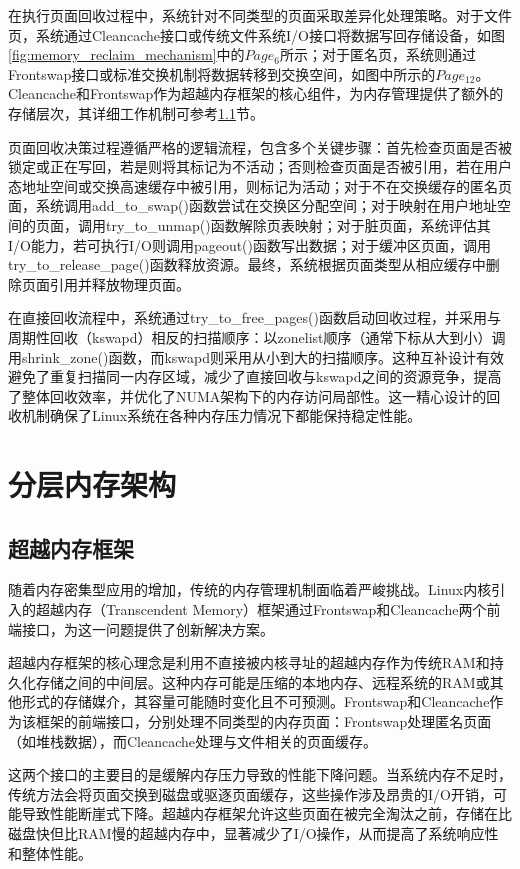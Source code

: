 在执行页面回收过程中，系统针对不同类型的页面采取差异化处理策略。对于文件页，系统通过Cleancache接口或传统文件系统I/O接口将数据写回存储设备，如图\ref{fig:memory_reclaim_mechanism}中的$Page_{6}$所示；对于匿名页，系统则通过Frontswap接口或标准交换机制将数据转移到交换空间，如图中所示的$Page_{12}$。Cleancache和Frontswap作为超越内存框架的核心组件，为内存管理提供了额外的存储层次，其详细工作机制可参考\ref{sec:超越内存框架}节。

页面回收决策过程遵循严格的逻辑流程，包含多个关键步骤：首先检查页面是否被锁定或正在写回，若是则将其标记为不活动；否则检查页面是否被引用，若在用户态地址空间或交换高速缓存中被引用，则标记为活动；对于不在交换缓存的匿名页面，系统调用add\_to\_swap()函数尝试在交换区分配空间；对于映射在用户地址空间的页面，调用try\_to\_unmap()函数解除页表映射；对于脏页面，系统评估其I/O能力，若可执行I/O则调用pageout()函数写出数据；对于缓冲区页面，调用try\_to\_release\_page()函数释放资源。最终，系统根据页面类型从相应缓存中删除页面引用并释放物理页面。

在直接回收流程中，系统通过try\_to\_free\_pages()函数启动回收过程，并采用与周期性回收（kswapd）相反的扫描顺序：以zonelist顺序（通常下标从大到小）调用shrink\_zone()函数，而kswapd则采用从小到大的扫描顺序。这种互补设计有效避免了重复扫描同一内存区域，减少了直接回收与kswapd之间的资源竞争，提高了整体回收效率，并优化了NUMA架构下的内存访问局部性。这一精心设计的回收机制确保了Linux系统在各种内存压力情况下都能保持稳定性能。

\section{分层内存架构}

\subsection{超越内存框架}
\label{sec:超越内存框架}
随着内存密集型应用的增加，传统的内存管理机制面临着严峻挑战。Linux内核引入的超越内存（Transcendent Memory）框架通过Frontswap和Cleancache两个前端接口，为这一问题提供了创新解决方案。

超越内存框架的核心理念是利用不直接被内核寻址的超越内存作为传统RAM和持久化存储之间的中间层。这种内存可能是压缩的本地内存、远程系统的RAM或其他形式的存储媒介，其容量可能随时变化且不可预测。Frontswap和Cleancache作为该框架的前端接口，分别处理不同类型的内存页面：Frontswap处理匿名页面（如堆栈数据），而Cleancache处理与文件相关的页面缓存。

这两个接口的主要目的是缓解内存压力导致的性能下降问题。当系统内存不足时，传统方法会将页面交换到磁盘或驱逐页面缓存，这些操作涉及昂贵的I/O开销，可能导致性能断崖式下降。超越内存框架允许这些页面在被完全淘汰之前，存储在比磁盘快但比RAM慢的超越内存中，显著减少了I/O操作，从而提高了系统响应性和整体性能。

